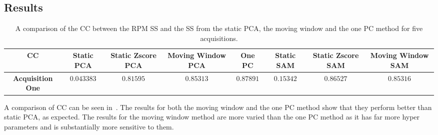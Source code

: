         \subsection{Results} \label{sec:pca_data_driven_surrogate_signal_extraction_methods_for_dynamic_pet_results}
            \begin{table}
                \centering
                
                \captionsetup{singlelinecheck=false, justification=centering}
                \caption{A comparison of the \gls{CC} between the \gls{RPM} \gls{SS} and the \gls{SS} from the static \gls{PCA}, the moving window and the one \gls{PC} method for five acquisitions.}
                
                \resizebox*{1.0\linewidth}{!}
                {
                    \begin{tabular}{||c|ccccccc||}
                        \hline
                        \textbf{\gls{CC}} & \textbf{Static \gls{PCA}} & \textbf{Static Zscore \gls{PCA}} & \textbf{Moving Window \gls{PCA}} & \textbf{One \gls{PC}} & \textbf{Static \gls{SAM}} & \textbf{Static Zscore \gls{SAM}} & \textbf{Moving Window \gls{SAM}} \\
                        \hline
                        \textbf{Acquisition One} & $0.043383$ & $0.81595$ & $0.85313$ & $0.87891$ & $0.15342$ & $0.86527$ & $0.85316$ \\
                        \hline
                    \end{tabular}
                }
                \label{tab:pca_data_driven_surrogate_signal_extraction_methods_for_dynamic_pet_results_cross_correlation}
            \end{table}
            
            A comparison of \gls{CC} can be seen in~. The results for both the moving window and the one \gls{PC} method show that they perform better than static \gls{PCA}, as expected. The results for the moving window method are more varied than the one \gls{PC} method as it has far more hyper parameters and is substantially more sensitive to them.
            
